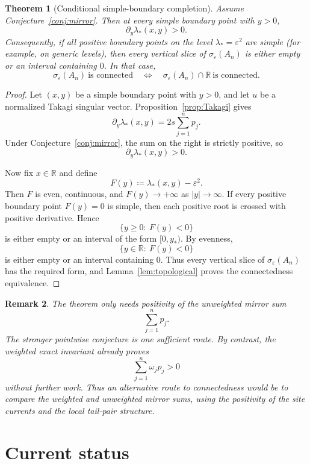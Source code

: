 \documentclass[11pt]{article}
\newtheorem{theorem}{Theorem}[section]
\newtheorem{remark}[theorem]{Remark}
\newcommand{\R}{\mathbb R}
\newcommand{\eps}{\varepsilon}
\begin{document}
\begin{theorem}[Conditional simple-boundary completion]\label{thm:conditional}
Assume Conjecture~\ref{conj:mirror}. Then at every simple boundary point with \(y>0\),
\[
\partial_y \lambda_*(x,y)>0.
\]
Consequently, if all positive boundary points on the level \(\lambda_*=\eps^2\) are simple
(for example, on generic levels), then every vertical slice of \(\sigma_\eps(A_n)\) is either
empty or an interval containing \(0\). In that case,
\[
\sigma_\eps(A_n)\ \text{is connected}
\quad\Longleftrightarrow\quad
\sigma_\eps(A_n)\cap\R\ \text{is connected}.
\]
\end{theorem}

\begin{proof}
Let \((x,y)\) be a simple boundary point with \(y>0\), and let \(u\) be a normalized Takagi
singular vector. Proposition~\ref{prop:Takagi} gives
\[
\partial_y \lambda_*(x,y)=2s\sum_{j=1}^n p_j.
\]
Under Conjecture~\ref{conj:mirror}, the sum on the right is strictly positive, so
\[
\partial_y \lambda_*(x,y)>0.
\]

Now fix \(x\in\R\) and define
\[
F(y)\coloneqq \lambda_*(x,y)-\eps^2.
\]
Then \(F\) is even, continuous, and \(F(y)\to+\infty\) as \(|y|\to\infty\). If every positive
boundary point \(F(y)=0\) is simple, then each positive root is crossed with positive derivative.
Hence
\[
\{y\ge 0:\ F(y)<0\}
\]
is either empty or an interval of the form \([0,y_*)\). By evenness,
\[
\{y\in\R:\ F(y)<0\}
\]
is either empty or an interval containing \(0\). Thus every vertical slice of
\(\sigma_\eps(A_n)\) has the required form, and Lemma~\ref{lem:topological} proves the
connectedness equivalence.
\end{proof}

\begin{remark}
The theorem only needs positivity of the unweighted mirror sum
\[
\sum_{j=1}^n p_j.
\]
The stronger pointwise conjecture is one sufficient route. By contrast, the weighted exact
invariant already proves
\[
\sum_{j=1}^n \omega_j p_j>0
\]
without further work. Thus an alternative route to connectedness would be to compare the
weighted and unweighted mirror sums, using the positivity of the site currents and the local
tail-pair structure.
\end{remark}

\section{Current status}\label{sec:status}
\end{document}
